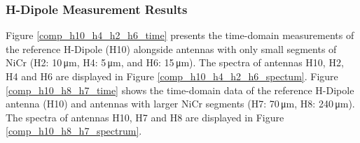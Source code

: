 

\subsubsection{H-Dipole Measurement Results}

Figure \ref{comp_h10_h4_h2_h6_time} presents the time-domain measurements of the reference H-Dipole (H10) alongside antennas with only small segments of NiCr (H2: \num{10}\,\si{\micro \meter}, H4: \num{5}\,\si{\micro \meter}, and H6: \num{15}\,\si{\micro \meter}). The spectra of antennas H10, H2, H4 and H6 are displayed in Figure \ref{comp_h10_h4_h2_h6_spectum}. Figure \ref{comp_h10_h8_h7_time} shows the time-domain data of the reference H-Dipole antenna (H10) and antennas with larger NiCr segments (H7: \num{70}\,\si{\micro \meter}, H8: \num{240}\,\si{\micro \meter}). The spectra of antennas H10, H7 and H8 are displayed in Figure \ref{comp_h10_h8_h7_spectrum}. 


